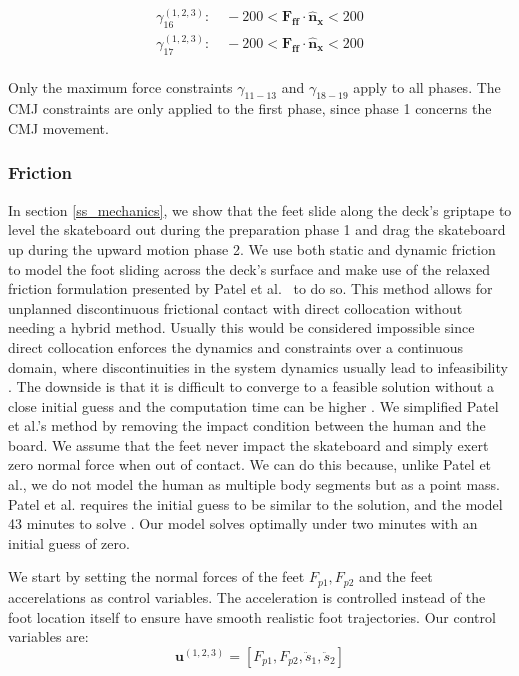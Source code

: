 \documentclass[default,iicol]{sn-jnl}
\theoremstyle{thmstyleone}%
\theoremstyle{thmstyletwo}%
\theoremstyle{thmstylethree}%
\begin{document}
\begin{equation}
    \begin{array}{c}
         \gamma_{16}^{(1,2,3)}:\quad  -200 < \mathbf{F_{ff}}\cdot \mathbf{\hat n_x} < 200  \\
         \gamma_{17}^{(1,2,3)}: \quad -200 < \mathbf{F_{ff}}\cdot \mathbf{\hat n_x} < 200 \\ 
    \end{array}
\end{equation}

Only the maximum force constraints $\gamma_{11-13}$ and $\gamma_{18-19}$ apply to all phases. The CMJ constraints are only applied to the first phase, since phase 1 concerns the CMJ movement. 

\subsubsection{Friction}
In section \ref{ss_mechanics}, we show that the feet slide along the deck's
griptape to level the skateboard out during the preparation phase 1 and drag
the skateboard up during the upward motion phase 2.
We use both static and dynamic friction to model the foot sliding across the
deck's surface and make use of the relaxed friction formulation presented by
Patel et al.~\cite{patel_contact-implicit_2019} to do so.
This method allows for unplanned discontinuous frictional contact with direct
collocation without needing a hybrid method.
Usually this would be considered impossible since direct collocation enforces
the dynamics and constraints over a continuous domain, where discontinuities in
the system dynamics usually lead to infeasibility
\cite{kelly_transcription_2017}.
The downside is that it is difficult to converge to a feasible solution without
a close initial guess and the computation time can be higher
\cite{shield_contact-implicit_2022,patel_contact-implicit_2019}.
We simplified Patel et al.'s method by removing the impact condition between
the human and the board.
We assume that the feet never impact the skateboard and simply exert zero
normal force when out of contact.
We can do this because, unlike Patel et al., we do not model the human as
multiple body segments but as a point mass.
Patel et al. requires the initial guess to be similar to the solution, and the
model 43 minutes to solve \cite{shield_contact-implicit_2022}. Our model solves
optimally under two minutes with an initial guess of zero.

We start by setting the normal forces of the feet $F_{p1},F_{p2}$ and the feet
accerelations as control variables.
The acceleration is controlled instead of the foot location itself to ensure
have smooth realistic foot trajectories.
Our control variables are:
%
\begin{equation}
    \mathbf{u}^{(1,2,3)} = [F_{p1},F_{p2},\ddot s_1, \ddot s_2]
\end{equation}
\end{document}
